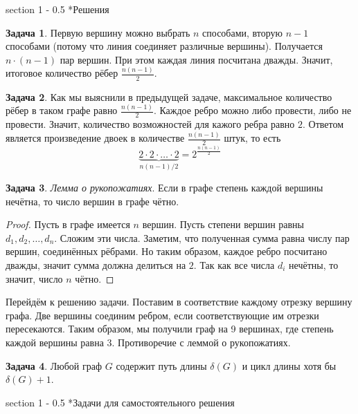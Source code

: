 \documentclass{article}
\makeatletter
\theoremstyle{definition}
\newtheorem{solution}{Задача}
\renewcommand{\section}{\@startsection
{section}%
{1}%
{\z@}%
{-\baselineskip}%
{0.5\baselineskip}%
{\centering\large\scshape}} %
\makeatother
\begin{document}
\section*{Решения}

\begin{solution}
	Первую вершину можно выбрать \( n \) способами, вторую \( n-1 \) способами 
	(потому что линия соединяет различные вершины). Получается \( n \cdot (n-1) 
	\) пар вершин. При этом каждая линия посчитана дважды. Значит, итоговое 
	количество рёбер \( \frac{n(n-1)}{2} \).
\end{solution}

\begin{solution}
	Как мы выяснили в предыдущей задаче, максимальное количество рёбер в таком 
	графе равно \( \frac{n(n-1)}{2} \). Каждое ребро можно либо провести, либо 
	не провести. Значит, количество возможностей для кажого ребра равно \( 2 
	\). Ответом является произведение двоек в количестве \( \frac{n(n-1)}{2} \) 
	штук, то есть
	\[
		\underbrace{2 \cdot 2 \cdot \ldots \cdot 2}_{n(n-1)/2} = 
		2^{\frac{n(n-1)}{2}}
	\]
\end{solution}

\begin{solution}
	\textit{Лемма о рукопожатиях}. Если в графе степень каждой вершины нечётна, 
	то число вершин в графе чётно.
	
	\begin{proof} Пусть в графе имеется \( n \) вершин.
		Пусть степени вершин равны \( d_1, d_2, \ldots, d_n \). Сложим эти 
		числа. Заметим, что полученная сумма равна числу пар вершин, 
		соединённых рёбрами. Но таким образом, каждое ребро посчитано дважды, 
		значит сумма должна делиться на \( 2 \). Так как все числа \( d_i \) 
		нечётны, то значит, число \( n \) чётно.
	\end{proof}
	Перейдём к решению задачи. Поставим в соответствие каждому отрезку вершину 
	графа. Две вершины соединим ребром, если соответствующие им отрезки 
	пересекаются. Таким образом, мы получили граф на 9 вершинах, где степень 
	каждой вершины равна 3. Противоречие с леммой о рукопожатиях.
\end{solution}

\begin{solution}
	Любой граф \( G \) содержит путь длины \( \delta(G) \) и цикл длины хотя бы 
	\(  \delta(G) + 1 \).
\end{solution}

\section*{Задачи для самостоятельного решения}
\end{document}
